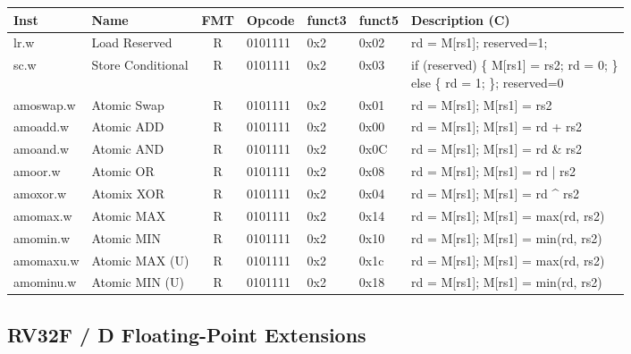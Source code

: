 \begin{center}
\begin{tabular}
{T | l | c | T | T | T | T } \hline
\rm Inst  & Name              & FMT   & \rm Opcode & \rm funct3 & \rm funct5 & \rm Description (C)         \\ \hline
lr.w      & Load Reserved     & R     & 0101111    & 0x2    & 0x02   & rd = M[rs1]; reserved=1; \\
sc.w      & Store Conditional & R     & 0101111    & 0x2    & 0x03   & \parbox[t]{2.5in}{ if (reserved) \{ M[rs1] = rs2; rd = 0; \} \\
                                                                        else \{ rd = 1; \}; reserved=0}  \\
amoswap.w & Atomic Swap       & R     & 0101111    & 0x2    & 0x01   & rd = M[rs1]; M[rs1] = rs2 \\
amoadd.w  & Atomic ADD        & R     & 0101111    & 0x2    & 0x00   & rd = M[rs1]; M[rs1] = rd + rs2\\
amoand.w  & Atomic AND        & R     & 0101111    & 0x2    & 0x0C   & rd = M[rs1]; M[rs1] = rd \& rs2\\
amoor.w   & Atomic OR         & R     & 0101111    & 0x2    & 0x08   & rd = M[rs1]; M[rs1] = rd | rs2 \\
amoxor.w  & Atomix XOR        & R     & 0101111    & 0x2    & 0x04   & rd = M[rs1]; M[rs1] = rd \^{} rs2\\
amomax.w  & Atomic MAX        & R     & 0101111    & 0x2    & 0x14   & rd = M[rs1]; M[rs1] = max(rd, rs2) \\
amomin.w  & Atomic MIN        & R     & 0101111    & 0x2    & 0x10   & rd = M[rs1]; M[rs1] = min(rd, rs2) \\
amomaxu.w & Atomic MAX (U)    & R     & 0101111    & 0x2    & 0x1c   & rd = M[rs1]; M[rs1] = max(rd, rs2) \\
amominu.w & Atomic MIN (U)    & R     & 0101111    & 0x2    & 0x18   & rd = M[rs1]; M[rs1] = min(rd, rs2) \\
\hline
\end{tabular}
\end{center}

\pagebreak

\subsection*{RV32F / D Floating-Point Extensions}

